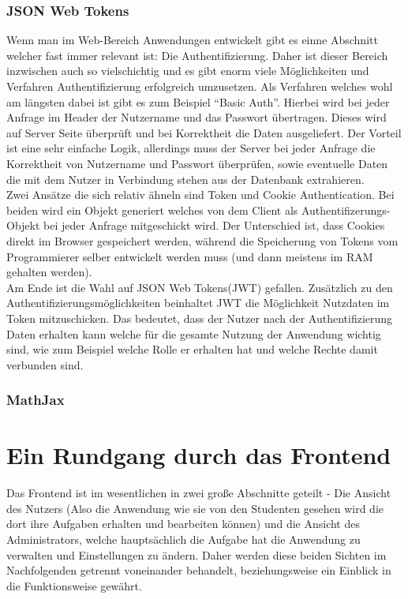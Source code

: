 \subsection{JSON Web Tokens} \label{JWT}

Wenn man im Web-Bereich Anwendungen entwickelt gibt es einne Abschnitt welcher fast immer relevant ist: Die Authentifizierung. Daher ist dieser Bereich inzwischen auch so vielschichtig und es gibt enorm viele Möglichkeiten und Verfahren Authentifizierung erfolgreich umzusetzen. Als Verfahren welches wohl am längsten dabei ist gibt es zum Beispiel ``Basic Auth''. Hierbei wird bei jeder Anfrage im Header der Nutzername und das Passwort übertragen. Dieses wird auf Server Seite überprüft und bei Korrektheit die Daten ausgeliefert. Der Vorteil ist eine sehr einfache Logik, allerdings muss der Server bei jeder Anfrage die Korrektheit von Nutzername und Passwort überprüfen, sowie eventuelle Daten die mit dem Nutzer in Verbindung stehen aus der Datenbank extrahieren. \\

Zwei Ansätze die sich relativ ähneln sind Token und Cookie Authentication. Bei beiden wird ein Objekt generiert welches von dem Client als Authentifizerungs-Objekt bei jeder Anfrage mitgeschickt wird. Der Unterschied ist, dass Cookies direkt im Browser gespeichert werden, während die Speicherung von Tokens vom Programmierer selber entwickelt werden muss (und dann meistens im RAM gehalten werden). \\

Am Ende ist die Wahl auf JSON Web Tokens(JWT) gefallen. Zusätzlich zu den Authentifizierungsmöglichkeiten beinhaltet JWT die Möglichkeit Nutzdaten im Token mitzuschicken. Das bedeutet, dass der Nutzer nach der Authentifizierung Daten erhalten kann welche für die gesamte Nutzung der Anwendung wichtig sind, wie zum Beispiel welche Rolle er erhalten hat und welche Rechte damit verbunden sind. 

\subsection{MathJax}

\chapter{Ein Rundgang durch das Frontend}

Das Frontend ist im wesentlichen in zwei große Abschnitte geteilt - Die Ansicht des Nutzers (Also die Anwendung wie sie von den Studenten gesehen wird die dort ihre Aufgaben erhalten und bearbeiten können) und die Ansicht des Administrators, welche hauptsächlich die Aufgabe hat die Anwendung zu verwalten und Einstellungen zu ändern. Daher werden diese beiden Sichten im Nachfolgenden getrennt voneinander behandelt, beziehungsweise ein Einblick in die Funktionsweise gewährt.

